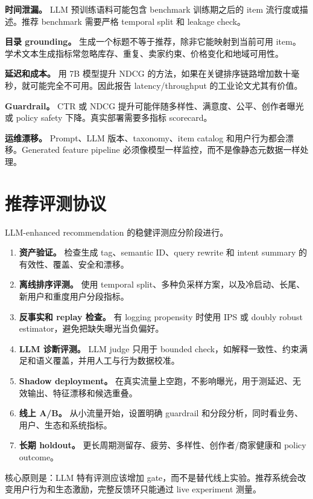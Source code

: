 \documentclass[UTF8,fontset=fandol,11pt]{ctexart}
\begin{document}
\textbf{时间泄漏。} LLM 预训练语料可能包含 benchmark 训练期之后的 item 流行度或描述。推荐 benchmark 需要严格 temporal split 和 leakage check。

\textbf{目录 grounding。} 生成一个标题不等于推荐，除非它能映射到当前可用 item。学术文本生成指标常忽略库存、重复、卖家约束、价格变化和地域可用性。

\textbf{延迟和成本。} 用 7B 模型提升 NDCG 的方法，如果在关键排序链路增加数十毫秒，就可能完全不可用。因此报告 latency/throughput 的工业论文尤其有价值。

\textbf{Guardrail。} CTR 或 NDCG 提升可能伴随多样性、满意度、公平、创作者曝光或 policy safety 下降。真实部署需要多指标 scorecard。

\textbf{运维漂移。} Prompt、LLM 版本、taxonomy、item catalog 和用户行为都会漂移。Generated feature pipeline 必须像模型一样监控，而不是像静态元数据一样处理。

\section{推荐评测协议}

LLM-enhanced recommendation 的稳健评测应分阶段进行。

\begin{enumerate}
  \item \textbf{资产验证。} 检查生成 tag、semantic ID、query rewrite 和 intent summary 的有效性、覆盖、安全和漂移。
  \item \textbf{离线排序评测。} 使用 temporal split、多种负采样方案，以及冷启动、长尾、新用户和重度用户分段指标。
  \item \textbf{反事实和 replay 检查。} 有 logging propensity 时使用 IPS 或 doubly robust estimator，避免把缺失曝光当负偏好。
  \item \textbf{LLM 诊断评测。} LLM judge 只用于 bounded check，如解释一致性、约束满足和语义覆盖，并用人工与行为数据校准。
  \item \textbf{Shadow deployment。} 在真实流量上空跑，不影响曝光，用于测延迟、无效输出、特征漂移和候选重叠。
  \item \textbf{线上 A/B。} 从小流量开始，设置明确 guardrail 和分段分析，同时看业务、用户、生态和系统指标。
  \item \textbf{长期 holdout。} 更长周期测留存、疲劳、多样性、创作者/商家健康和 policy outcome。
\end{enumerate}

核心原则是：LLM 特有评测应该增加 gate，而不是替代线上实验。推荐系统会改变用户行为和生态激励，完整反馈环只能通过 live experiment 测量。
\end{document}
